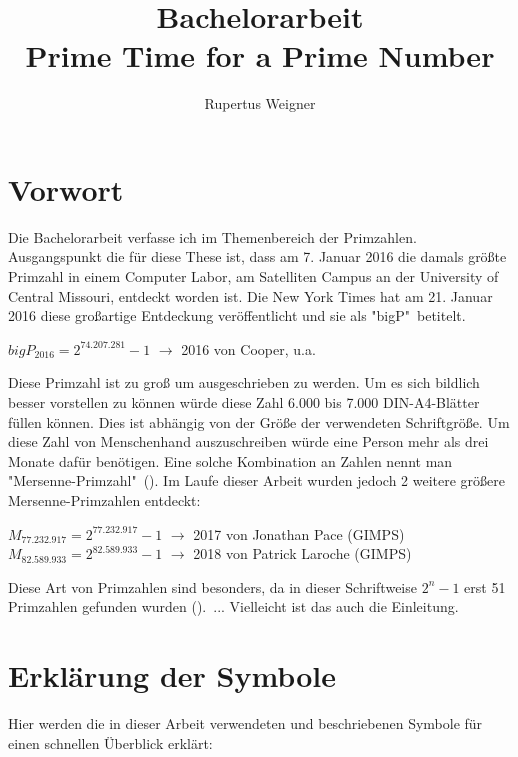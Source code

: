 \documentclass[12pt,a4paper]{article}
\title{Bachelorarbeit\\Prime Time for a Prime Number}
\author{Rupertus Weigner}
\theoremstyle{definition}
\begin{document}
\maketitle
\thispagestyle{empty}
\newpage

\section*{Vorwort}
Die Bachelorarbeit verfasse ich im Themenbereich der Primzahlen.
Ausgangspunkt die für diese These ist, dass am 7. Januar 2016 die damals größte Primzahl in einem Computer Labor, am Satelliten Campus an der University of Central Missouri, entdeckt worden ist.
Die New York Times hat am 21. Januar 2016 diese großartige Entdeckung veröffentlicht und sie als "bigP"\ betitelt.
\begin{center}
$bigP_{2016} = 2^{74.207.281}-1$ $\rightarrow$ 2016 von Cooper, u.a.
\end{center}

Diese Primzahl ist zu groß um ausgeschrieben zu werden.
Um es sich bildlich besser vorstellen zu können würde diese Zahl 6.000 bis 7.000 DIN-A4-Blätter füllen können.
Dies ist abhängig von der Größe der verwendeten Schriftgröße.
Um diese Zahl von Menschenhand auszuschreiben würde eine Person mehr als drei Monate dafür benötigen.
Eine solche Kombination an Zahlen nennt man "Mersenne-Primzahl"\ (\cite{TheNewYorkTimes2016}).
Im Laufe dieser Arbeit wurden jedoch 2 weitere größere Mersenne-Primzahlen entdeckt:
\begin{center}
$M_{77.232.917} = 2^{77.232.917}-1$ $\rightarrow$ 2017 von Jonathan Pace (GIMPS)\\
$M_{82.589.933} = 2^{82.589.933}-1$ $\rightarrow$ 2018 von Patrick Laroche (GIMPS)
\end{center}

Diese Art von Primzahlen sind besonders, da in dieser Schriftweise $2^n-1$ erst 51 Primzahlen gefunden wurden (\cite{ListederMersennePrimzahlen2020}).\ ... Vielleicht ist das auch die Einleitung.
\newpage

\tableofcontents
\thispagestyle{empty}
\newpage

\section*{Erklärung der Symbole}
Hier werden die in dieser Arbeit verwendeten und beschriebenen Symbole für einen schnellen Überblick erklärt:
\end{document}
